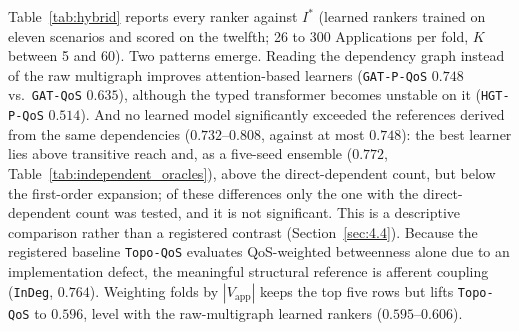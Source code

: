 Table~\ref{tab:hybrid} reports every ranker against $I^*$ (learned rankers trained on eleven scenarios and scored on the twelfth; 26 to 300 Applications per fold, $K$ between 5 and 60). Two patterns emerge. Reading the dependency graph instead of the raw multigraph improves attention-based learners (\texttt{GAT-P-QoS} $0.748$ vs.\ \texttt{GAT-QoS} $0.635$), although the typed transformer becomes unstable on it (\texttt{HGT-P-QoS} $0.514$). And no learned model significantly exceeded the references derived from the same dependencies ($0.732$--$0.808$, against at most $0.748$): the best learner lies above transitive reach and, as a five-seed ensemble ($0.772$, Table~\ref{tab:independent_oracles}), above the direct-dependent count, but below the first-order expansion; of these differences only the one with the direct-dependent count was tested, and it is not significant. This is a descriptive comparison rather than a registered contrast (Section~\ref{sec:4.4}). Because the registered baseline \texttt{Topo-QoS} evaluates QoS-weighted betweenness alone due to an implementation defect, the meaningful structural reference is afferent coupling (\texttt{InDeg}, $0.764$). Weighting folds by $|V_{\text{app}}|$ keeps the top five rows but lifts \texttt{Topo-QoS} to $0.596$, level with the raw-multigraph learned rankers ($0.595$--$0.606$).

